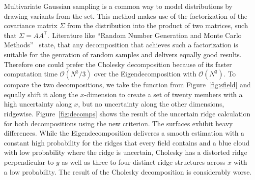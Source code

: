 Multivariate Gaussian sampling is a common way to model distributions
by drawing variants from the set. This method makes use of the
factorization of the covariance matrix $\Sigma$ from the distribution into
the product of two matrices, such that $\Sigma = AA^\top$. Literature
like ``Random Number Generation and Monte Carlo Methods''~\cite{Monte}
state, that any decomposition that achieves such a factorization is
suitable for the genration of random samples and delivers equally
good results. Therefore one could prefer the Cholesky decomposition
because of its faster computation time $\mathcal{O}(N^3/3)$ over
the Eigendecomposition with $\mathcal{O}(N^3)$. To compare the two
decompositions, we take the function from Figure~\ref{fig:sfield} and
equally shift it along the $x$-dimension to create a set of twenty
members with a high uncertainty along $x$, but no uncertainty along
the other dimensions, ridgewise. Figure~\ref{fig:decomps} shows the
result of the uncertain ridge calculation for both decompositions using
the new criterion. The surfaces exhibit heavy differences. While the
Eigendecomposition deliveres a smooth estimation with a constant high
probability for the ridges that every field contains and a blue cloud
with low probability where the ridge is uncertain, Cholesky has a
distorted ridge perpendicular to $y$ as well as three to four distinct
ridge structures across $x$ with a low probability. The result of the
Cholesky decomposition is considerably worse.\\
